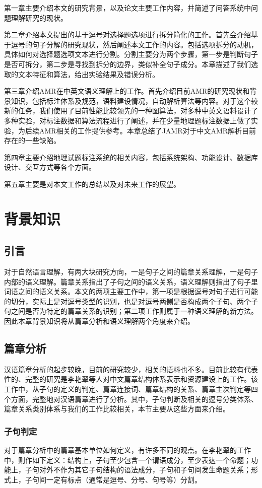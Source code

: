 \documentclass[master, winfont]{njuthesis}
\begin{document}
第一章主要介绍本文的研究背景，以及论文主要工作内容，并简述了问答系统中问题理解研究的现状。

第二章介绍本文提出的基于逗号对选择题选项进行拆分简化的工作。首先会介绍基于逗号的句子分解的研究现状，然后阐述本文工作的内容。包括选项拆分的动机，具体如何对选择题选项文本进行分割。分割主要分为两个步骤，第一步是判断句子是否可拆分，第二步是寻找到拆分的边界，类似补全句子成分。本章描述了我们选取的文本特征和算法，给出实验结果及错误分析。

第三章介绍AMR在中英文语义理解上的工作。首先介绍目前AMR的研究现状和背景知识，包括标注体系及规范，语料建设情况，自动解析算法等内容。对于这个较新的任务，我们使用了目前性能比较领先的一种图算法，对多种中英文语料设计了多种实验，对标注数据和算法流程进行了阐述，并在少量地理题标注数据上做了实验，为后续AMR相关的工作提供参考。本章总结了JAMR对于中文AMR解析目前存在的一些缺陷。

第四章主要介绍地理试题标注系统的相关内容，包括系统架构、功能设计、数据库设计、交互方式等各个方面。

第五章主要是对本文工作的总结以及对未来工作的展望。

\chapter{背景知识}
\section{引言}
对于自然语言理解，有两大块研究方向，一是句子之间的篇章关系理解，一是句子内部的语义理解。篇章关系指出了子句之间的语义关系，语义理解则指出了句子里词语之间的语义关系。本文的两项主要工作中，第一项是根据逗号对句子进行可能的切分，实际上是对逗号类型的识别，也是对逗号两侧是否构成两个子句、两个子句之间是否为特定的篇章关系的识别；第二项工作则属于一种语义理解的新方法。因此本章背景知识将从篇章分析和语义理解两个角度来介绍。

\section{篇章分析}
汉语篇章分析的起步较晚，目前的研究较少，相关的语料也不多。目前比较有代表性的、完整的研究是李艳翠等人\cite{liyancui2015}对中文篇章结构体系表示和资源建设上的工作。该工作中，从子句的定义的判定、篇章连接词、篇章结构的关系、篇章主次判定等四个方面，完整地对汉语篇章进行了分析。其中，子句判断及相关的逗号分类体系、篇章关系类别体系与我们的工作比较相关，本节主要从这些方面来介绍。

\subsection{子句判定}
对于篇章分析中的篇章基本单位如何定义，有许多不同的观点。在李艳翠的工作中，则作如下定义：结构上，子句至少包含一个谓语成分，至少表达一个命题；功能上，子句对外不作为其它子句结构的语法成分，子句和子句间发生命题关系；形式上，子句间一定有标点（通常是逗号、分号、句号等）分割\cite{liyancui2015}。
\end{document}
